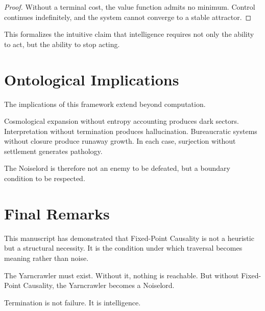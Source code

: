 \documentclass[12pt]{article}
\theoremstyle{remark}
\begin{document}
\begin{proof}
Without a terminal cost, the value function admits no minimum. Control continues indefinitely, and the system cannot converge to a stable attractor.
\end{proof}

This formalizes the intuitive claim that intelligence requires not only the ability to act, but the ability to stop acting.

\section{Ontological Implications}

The implications of this framework extend beyond computation.

Cosmological expansion without entropy accounting produces dark sectors. Interpretation without termination produces hallucination. Bureaucratic systems without closure produce runaway growth. In each case, surjection without settlement generates pathology.

The Noiselord is therefore not an enemy to be defeated, but a boundary condition to be respected.

\section{Final Remarks}

This manuscript has demonstrated that Fixed-Point Causality is not a heuristic but a structural necessity. It is the condition under which traversal becomes meaning rather than noise.

The Yarncrawler must exist. Without it, nothing is reachable. But without Fixed-Point Causality, the Yarncrawler becomes a Noiselord.

Termination is not failure. It is intelligence.
\end{document}
